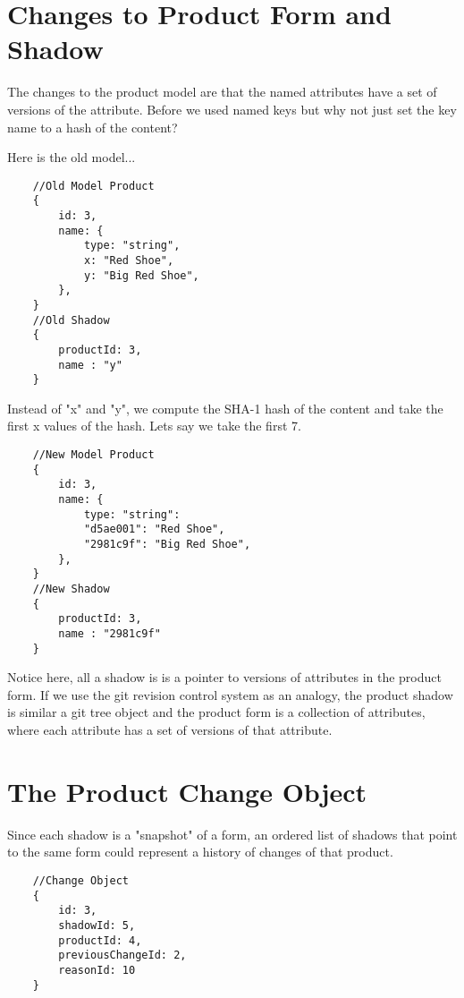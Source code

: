 \documentclass[11pt]{article}
\begin{document}
\section{Changes to Product Form and Shadow}

The changes to the product model are that the named attributes have a set 
of versions of the attribute. Before we used named keys but why not just
set the key name to a hash of the content?

Here is the old model...

\begin{lstlisting}
    //Old Model Product 
    {
        id: 3,
        name: { 
            type: "string", 
            x: "Red Shoe", 
            y: "Big Red Shoe", 
        },
    }
    //Old Shadow
    {
        productId: 3,
        name : "y"
    }
\end{lstlisting}

Instead of "x" and "y", we compute the SHA-1 hash of the content and take the
first x values of the hash. Lets say we take the first 7.

\begin{lstlisting}
    //New Model Product 
    {
        id: 3,
        name: { 
            type: "string": 
            "d5ae001": "Red Shoe", 
            "2981c9f": "Big Red Shoe", 
        },
    }
    //New Shadow
    {
        productId: 3,
        name : "2981c9f"
    }
\end{lstlisting}

Notice here, all a shadow is is a pointer to versions of attributes in the
product form. If we use the git revision control system as an analogy, the product 
shadow is similar a git tree object and the product form is a collection of 
attributes, where each attribute has a set of versions of that attribute.

\section{The Product Change Object}

Since each shadow is a "snapshot" of a form, an ordered list of shadows that 
point to the same form could represent a history of changes of that product.

\begin{lstlisting}
    //Change Object
    {
        id: 3,
        shadowId: 5,
        productId: 4,
        previousChangeId: 2,
        reasonId: 10
    }
\end{lstlisting}
\end{document}
